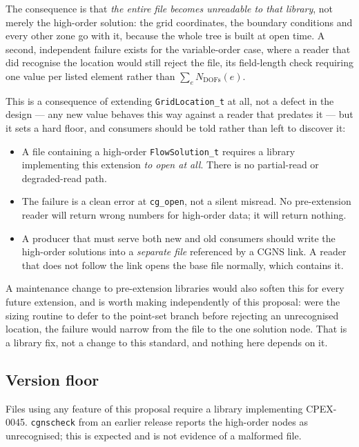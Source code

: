 \documentclass[11pt,letterpaper]{article}
\newif\ifvfourdraft
\newenvironment{v4block}{\ifvfourdraft\color{v4violet}\fi\ignorespaces}{\par}
\begin{document}
\begin{v4block}
The consequence is that \emph{the entire file becomes unreadable to that library},
not merely the high-order solution: the grid coordinates, the boundary conditions
and every other zone go with it, because the whole tree is built at open time.  A
second, independent failure exists for the variable-order case, where a reader that
did recognise the location would still reject the file, its field-length check
requiring one value per listed element rather than $\sum_e N_\mathrm{DOFs}(e)$.

This is a consequence of extending \texttt{GridLocation\_t} at all, not a defect in
the design --- any new value behaves this way against a reader that predates it ---
but it sets a hard floor, and consumers should be told rather than left to
discover it:

\begin{itemize}[nosep,leftmargin=1.5em]
  \item A file containing a high-order \texttt{FlowSolution\_t} requires a library
    implementing this extension \emph{to open at all}.  There is no partial-read
    or degraded-read path.
  \item The failure is a clean error at \texttt{cg\_open}, not a silent misread.
    No pre-extension reader will return wrong numbers for high-order data; it will
    return nothing.
  \item A producer that must serve both new and old consumers should write the
    high-order solutions into a \emph{separate file} referenced by a CGNS link.  A
    reader that does not follow the link opens the base file normally, which
    contains it.
\end{itemize}

\noindent A maintenance change to pre-extension libraries would also soften this
for every future extension, and is worth making independently of this proposal:
were the sizing routine to defer to the point-set branch before rejecting an
unrecognised location, the failure would narrow from the file to the one solution
node.  That is a library fix, not a change to this standard, and nothing here
depends on it.

\subsection{Version floor}

Files using any feature of this proposal require a library implementing
CPEX-0045.  \texttt{cgnscheck} from an earlier release reports the high-order
nodes as unrecognised; this is expected and is not evidence of a malformed file.
\end{v4block}
\end{document}
